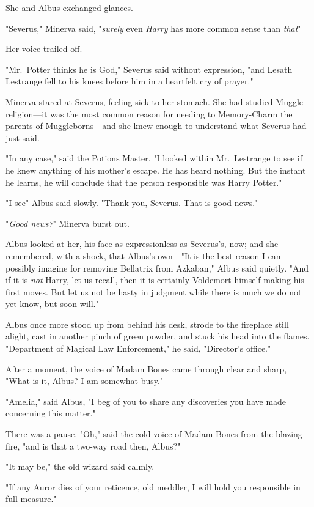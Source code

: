 She and Albus exchanged glances.

"Severus," Minerva said, "\emph{surely{\el}} even \emph{Harry}{\el} has
more common sense than \emph{that{\el}}"

Her voice trailed off.

"Mr.~Potter thinks he is God," Severus said without expression, "and Lesath
Lestrange fell to his knees before him in a heartfelt cry of prayer."

Minerva stared at Severus, feeling sick to her stomach. She had studied Muggle
religion---it was the most common reason for needing to Memory-Charm the
parents of Muggleborns---and she knew enough to understand what Severus had
just said.

"In any case," said the Potions Master. "I looked within Mr.~Lestrange to see
if he knew anything of his mother's escape. He has heard nothing. But the
instant he learns, he will conclude that the person responsible was Harry
Potter."

"I see{\el}" Albus said slowly. "Thank you, Severus. That is good news."

"\emph{Good news?}" Minerva burst out.

Albus looked at her, his face as expressionless as Severus's, now; and she
remembered, with a shock, that Albus's own---"It is the best reason I can
possibly imagine for removing Bellatrix from Azkaban," Albus said quietly. "And
if it is \emph{not} Harry, let us recall, then it is certainly Voldemort
himself making his first moves. But let us not be hasty in judgment while there
is much we do not yet know, but soon will."

Albus once more stood up from behind his desk, strode to the fireplace still
alight, cast in another pinch of green powder, and stuck his head into the
flames. "Department of Magical Law Enforcement," he said, "Director's office."

After a moment, the voice of Madam Bones came through clear and sharp, "What is
it, Albus? I am somewhat busy."

"Amelia," said Albus, "I beg of you to share any discoveries you have made
concerning this matter."

There was a pause. "Oh," said the cold voice of Madam Bones from the blazing
fire, "and is that a two-way road then, Albus?"

"It may be," the old wizard said calmly.

"If any Auror dies of your reticence, old meddler, I will hold you responsible
in full measure."


